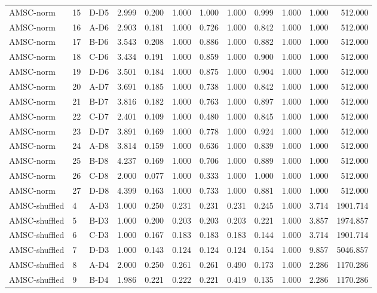 \begin{table}[ht]
\begin{tabular}{lllrrrrrrrrr}
AMSC-norm & 15 & D-D5 & 2.999 & 0.200 & 1.000 & 1.000 & 1.000 & 0.999 & 1.000 & 1.000 & 512.000 \\
AMSC-norm & 16 & A-D6 & 2.903 & 0.181 & 1.000 & 0.726 & 1.000 & 0.842 & 1.000 & 1.000 & 512.000 \\
AMSC-norm & 17 & B-D6 & 3.543 & 0.208 & 1.000 & 0.886 & 1.000 & 0.882 & 1.000 & 1.000 & 512.000 \\
AMSC-norm & 18 & C-D6 & 3.434 & 0.191 & 1.000 & 0.859 & 1.000 & 0.900 & 1.000 & 1.000 & 512.000 \\
AMSC-norm & 19 & D-D6 & 3.501 & 0.184 & 1.000 & 0.875 & 1.000 & 0.904 & 1.000 & 1.000 & 512.000 \\
AMSC-norm & 20 & A-D7 & 3.691 & 0.185 & 1.000 & 0.738 & 1.000 & 0.842 & 1.000 & 1.000 & 512.000 \\
AMSC-norm & 21 & B-D7 & 3.816 & 0.182 & 1.000 & 0.763 & 1.000 & 0.897 & 1.000 & 1.000 & 512.000 \\
AMSC-norm & 22 & C-D7 & 2.401 & 0.109 & 1.000 & 0.480 & 1.000 & 0.845 & 1.000 & 1.000 & 512.000 \\
AMSC-norm & 23 & D-D7 & 3.891 & 0.169 & 1.000 & 0.778 & 1.000 & 0.924 & 1.000 & 1.000 & 512.000 \\
AMSC-norm & 24 & A-D8 & 3.814 & 0.159 & 1.000 & 0.636 & 1.000 & 0.839 & 1.000 & 1.000 & 512.000 \\
AMSC-norm & 25 & B-D8 & 4.237 & 0.169 & 1.000 & 0.706 & 1.000 & 0.889 & 1.000 & 1.000 & 512.000 \\
AMSC-norm & 26 & C-D8 & 2.000 & 0.077 & 1.000 & 0.333 & 1.000 & 1.000 & 1.000 & 1.000 & 512.000 \\
AMSC-norm & 27 & D-D8 & 4.399 & 0.163 & 1.000 & 0.733 & 1.000 & 0.881 & 1.000 & 1.000 & 512.000 \\
AMSC-shuffled & 4 & A-D3 & 1.000 & 0.250 & 0.231 & 0.231 & 0.231 & 0.245 & 1.000 & 3.714 & 1901.714 \\
AMSC-shuffled & 5 & B-D3 & 1.000 & 0.200 & 0.203 & 0.203 & 0.203 & 0.221 & 1.000 & 3.857 & 1974.857 \\
AMSC-shuffled & 6 & C-D3 & 1.000 & 0.167 & 0.183 & 0.183 & 0.183 & 0.144 & 1.000 & 3.714 & 1901.714 \\
AMSC-shuffled & 7 & D-D3 & 1.000 & 0.143 & 0.124 & 0.124 & 0.124 & 0.154 & 1.000 & 9.857 & 5046.857 \\
AMSC-shuffled & 8 & A-D4 & 2.000 & 0.250 & 0.261 & 0.261 & 0.490 & 0.173 & 1.000 & 2.286 & 1170.286 \\
AMSC-shuffled & 9 & B-D4 & 1.986 & 0.221 & 0.222 & 0.221 & 0.419 & 0.135 & 1.000 & 2.286 & 1170.286 \\

\end{tabular}
\end{table}
